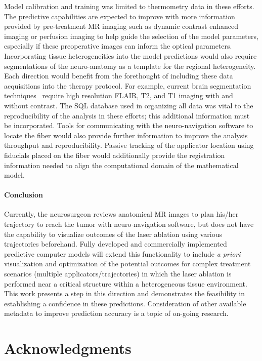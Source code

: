 \documentclass[12pt]{article}
\begin{document}
Model calibration and training was limited to thermometry data in these efforts. 
The predictive capabilities are expected to improve with more information
provided by pre-treatment MR imaging such as dynamic contrast enhanced imaging
or perfusion imaging to help guide the selection of the model parameters,
especially if these preoperative images can inform the optical parameters.
Incorporating tissue heterogeneities into the model predictions would also
require segmentations of the neuro-anatomy as a template for the regional heterogeneity.
Each direction would benefit from the forethought of including these data
acquisitions into the therapy protocol. 
For example, current brain segmentation techniques~\cite{Menze2014} require high resolution
FLAIR, T2, and T1 imaging with and without contrast.
The SQL database used in organizing all data was vital to the reproducibility
of the analysis in these efforts; this additional information must be
incorporated.
Tools for communicating with the neuro-navigation software to locate the fiber
would also provide further information to improve the analysis throughput
and reproducibility.
Passive tracking of the applicator location using fiducials placed on the fiber
would additionally provide the registration information needed to align the
computational domain of the mathematical model. 


\paragraph{Conclusion}
Currently, the neurosurgeon reviews anatomical MR images to plan his/her
trajectory to reach the tumor with neuro-navigation software, but does not
have the capability to visualize outcomes of the laser ablation using
various trajectories beforehand. 
Fully developed and commercially implemented predictive computer models 
will extend this functionality to include \textit{a priori} visualization 
{\color{red} and optimization} of the
potential outcomes for complex treatment scenarios (multiple
applicators/trajectories) in which the laser ablation is performed near a
critical structure within a heterogeneous tissue environment. 
This work presents a step in this direction and demonstrates
the feasibility in establishing a confidence in these predictions.
Consideration of other available metadata to improve prediction accuracy
is a topic of on-going research.


\section*{Acknowledgments}
\end{document}
